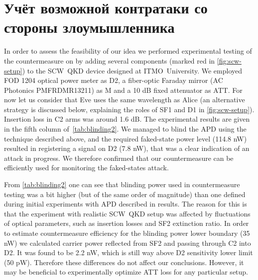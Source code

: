 \pagebreak


\section{Учёт возможной контратаки со стороны злоумышленника}\label{ch:ch3/sec7}

In order to assess the feasibility of our idea we performed experimental testing of the countermeasure on by adding several components (marked red in \ref{fig:scw-setup}) to the SCW~QKD device designed at ITMO~University. We employed FOD 1204 optical power meter as D2, a fiber-optic Faraday mirror (AC Photonics PMFRDMR13211) as M and a 10 dB fixed attenuator as ATT. For now let us consider that Eve uses the same wavelength as Alice (an alternative strategy is discussed below, explaining the roles of SF1 and D1 in \ref{fig:scw-setup}). Insertion loss in C2 arms was around 1.6 dB. The experimental results are given in the fifth column of~\ref{tab:blinding2}. We managed to blind the APD using the technique described above, and the required faked-state power level (114.8 nW) resulted in registering a signal on D2 (7.8 nW), that was a clear indication of an attack in progress. We therefore confirmed that our countermeasure can be efficiently used for monitoring the faked-states attack.

From \ref{tab:blinding2} one can see that blinding power used in countermeasure testing was a bit higher (but of the same order of magnitude) than one defined during initial experiments with APD described in results. The reason for this is that the experiment with realistic SCW~QKD setup was affected by fluctuations of optical parameters, such as insertion losses and SF2 extinction ratio. In order to estimate countermeasure efficiency for the blinding power lower boundary (35 nW) we calculated carrier power reflected from SF2 and passing through C2 into D2. It was found to be 2.2 nW, which is still way above D2 sensitivity lower limit (50 pW). Therefore these differences do not affect our conclusions. However, it may be beneficial to experimentally optimize ATT loss for any particular setup.

